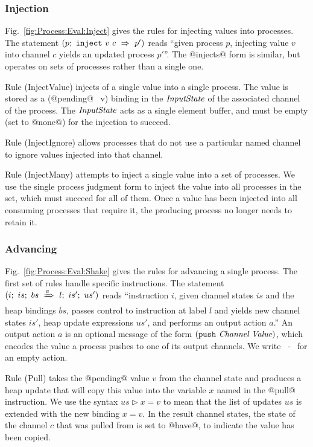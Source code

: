 \subsubsection{Injection}
Fig.~\ref{fig:Process:Eval:Inject} gives the rules for injecting values into processes. The statement $(p;~\texttt{inject}~v~c~\Rightarrow~p')$ reads ``given process $p$, injecting value $v$ into channel $c$ yields an updated process $p'$''. The @injects@ form is similar, but operates on sets of processes rather than a single one.

Rule (InjectValue) injects of a single value into a single process. The value is stored as a (@pending@~ v) binding in the $\textit{InputState}$ of the associated channel of the process. The $\textit{InputState}$ acts as a single element buffer, and must be empty (set to @none@) for the injection to succeed.

Rule (InjectIgnore) allows processes that do not use a particular named channel to ignore values injected into that channel.

Rule (InjectMany) attempts to inject a single value into a set of processes. We use the single process judgment form to inject the value into all processes in the set, which must succeed for all of them. Once a value has been injected into all consuming processes that require it, the producing process no longer needs to retain it.






\eject{}
\subsubsection{Advancing}
Fig.~\ref{fig:Process:Eval:Shake} gives the rules for advancing a single process. The first set of rules handle specific instructions. The statement $(i;~is;~bs~\xRightarrow{a}~l;~is';~us')$ reads ``instruction $i$, given channel states $is$ and the heap bindings $bs$, passes control to instruction at label $l$ and yields new channel states $is'$, heap update expressions $us'$, and performs an output action $a$.'' An output action $a$ is an optional message of the form $(\texttt{push}~\textit{Channel}~\textit{Value})$, which encodes the value a process pushes to one of its output channels. We write ~$\cdot$~ for an empty action. 

\eject{}
Rule (Pull) takes the @pending@ value $v$ from the channel state and produces a heap update that will copy this value into the variable $x$ named in the @pull@ instruction. We use the syntax $us \rhd x=v$ to mean that the list of updates $us$ is extended with the new binding $x=v$. In the result channel states, the state of the channel $c$ that was pulled from is set to @have@, to indicate the value has been copied.

